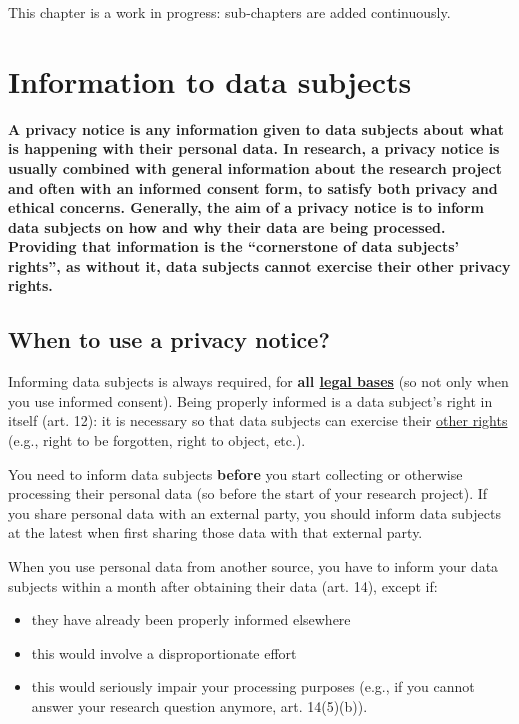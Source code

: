 \documentclass[
]{book}
\providecommand{\tightlist}{%
  \setlength{\itemsep}{0pt}\setlength{\parskip}{0pt}}
\begin{document}
This chapter is a work in progress: sub-chapters are added continuously.

\hypertarget{privacy-notices}{%
\section{Information to data subjects}\label{privacy-notices}}

\textbf{A privacy notice is any information given to data subjects about what is
happening with their personal data. In research, a privacy notice is usually
combined with general information about the research project and often with an
informed consent form, to satisfy both privacy and ethical concerns. Generally,
the aim of a privacy notice is to inform data subjects on how and why their
data are being processed. Providing that information is the ``cornerstone of
data subjects' rights'', as without it, data subjects cannot exercise their other
privacy rights.}

\hypertarget{when-to-use-a-privacy-notice}{%
\subsection{When to use a privacy notice?}\label{when-to-use-a-privacy-notice}}

Informing data subjects is always required, for \textbf{all \protect\hyperlink{legal-basis}{legal bases}}
(so not only when you use informed consent). Being properly informed is a data
subject's right in itself (art. 12):
it is necessary so that data subjects can exercise their \protect\hyperlink{data-subject-rights}{other rights}
(e.g., right to be forgotten, right to object, etc.).

You need to inform data subjects \textbf{before} you start collecting or otherwise
processing their personal data (so before the start of your research project).
If you share personal data with an external party, you should inform data
subjects at the latest when first sharing those data with that external party.

When you use personal data from another source, you have to inform your data
subjects within a month after obtaining their data
(art. 14), except
if:

\begin{itemize}
\tightlist
\item
  they have already been properly informed elsewhere
\item
  this would involve a disproportionate effort
\item
  this would seriously impair your processing purposes (e.g., if you cannot
  answer your research question anymore,
  art. 14(5)(b)).
\end{itemize}
\end{document}
